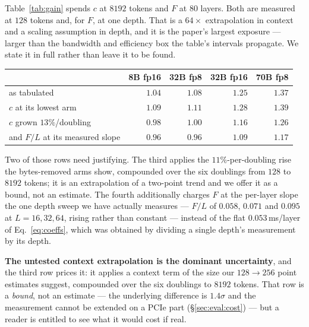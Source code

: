 Table~\ref{tab:gain} spends $c$ at $8192$ tokens and $F$ at $80$ layers. Both are
measured at $128$ tokens and, for $F$, at one depth. That is a $64\times$
extrapolation in context and a scaling assumption in depth, and it is the paper's
largest exposure --- larger than the bandwidth and efficiency box the table's
intervals propagate. We state it in full rather than leave it to be found.

\begin{center}\small
\begin{tabular}{lrrrr}
\toprule
 & 8B fp16 & 32B fp8 & 32B fp16 & 70B fp8 \\
\midrule
as tabulated & $1.04$ & $1.08$ & $\mathbf{1.25}$ & $\mathbf{1.37}$ \\
$c$ at its lowest arm & $1.09$ & $1.11$ & $1.28$ & $1.39$ \\
$c$ grown $13\%$/doubling & $0.98$ & $1.00$ & $1.16$ & $1.26$ \\
and $F/L$ at its measured slope & $0.96$ & $0.96$ & $1.09$ & $1.17$ \\
\bottomrule
\end{tabular}
\end{center}

Two of those rows need justifying. The third applies the $11\%$-per-doubling rise
the bytes-removed arms show, compounded over the six doublings from $128$ to $8192$
tokens; it is an extrapolation of a two-point trend and we offer it as a bound, not
an estimate. The fourth additionally charges $F$ at the per-layer slope the one
depth sweep we have actually measures --- $F/L$ of $0.058$, $0.071$ and $0.095$ at
$L = 16, 32, 64$, rising rather than constant --- instead of the flat
$0.053$\,ms/layer of Eq.~\ref{eq:coeffs}, which was obtained by dividing a single
depth's measurement by its depth.

\textbf{The untested context extrapolation is the dominant uncertainty}, and the
third row prices it: it applies a context term of the size our $128 \to 256$ point
estimates suggest, compounded over the six doublings to $8192$ tokens. That row is a
\emph{bound}, not an estimate --- the underlying difference is $1.4\sigma$ and the
measurement cannot be extended on a PCIe part (\S\ref{sec:eval:cost}) --- but a
reader is entitled to see what it would cost if real.


